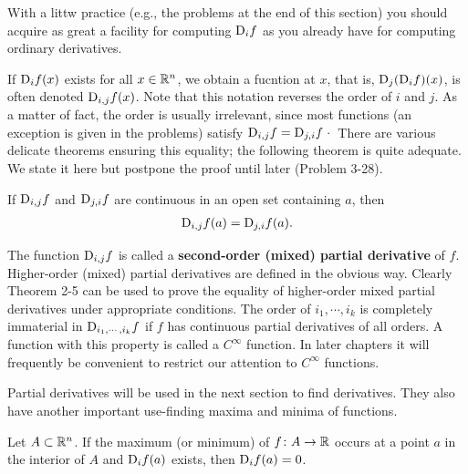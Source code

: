 With a littw practice (e.g., the problems at the end of this
section) you should acquire as great a facility for computing
$\mathrm{D}_if$ as you already have for computing ordinary derivatives.

If $\mathrm{D}_if(x)$ exists for all $x\in \mathbb{R}^n$, we obtain a fucntion at $x$, that 
is, $\mathrm{D}_j(\mathrm{D}_if)(x)$, is often denoted $\mathrm{D}_{i,j}f(x)$. Note that this notation 
reverses the order of $i$ and $j$. As a matter of fact, the
order is usually irrelevant, since most functions (an exception is
given in the problems) satisfy $\mathrm{D}_{i,j}f = \mathrm{D}_{j,i}f$· There are various
delicate theorems ensuring this equality; the following theorem
is quite adequate. We state it here but postpone the proof until later (Problem 3-28).

\begin{theorem}
    If $\mathrm{D}_{i,j}f$ and $\mathrm{D}_{j,i}f$ are continuous in an open set containing $a$, then 
    \begin{align*}
        \mathrm{D}_{i,j}f(a) = \mathrm{D}_{j,i}f(a).
    \end{align*}
\end{theorem}

The function $\mathrm{D}_{i,j}f$ is called a \textbf{second-order (mixed) partial derivative}
of $f$. Higher-order (mixed) partial derivatives are defined in the obvious way.
Clearly Theorem 2-5 can be used to prove the equality of higher-order mixed
partial derivatives under appropriate conditions.
The order of $i_1, \cdots ,i_k$ is completely immaterial in $\mathrm{D}_{i_1,\cdots,i_k}f$
if $f$ has continuous partial derivatives of all orders. A function
with this property is called a $C^\infty$ function. In later chapters
it will frequently be convenient to restrict our attention to $C^\infty$
functions.

Partial derivatives will be used in the next section to find
derivatives. They also have another important use-finding
maxima and minima of functions.

\begin{theorem}
  Let $A\subset \mathbb{R}^n$. If the maximum (or minimum) of $f\colon{}A\to \mathbb{R}$ occurs at a 
  point $a$ in the interior of $A$ and $\mathrm{D}_if(a)$ exists, then $\mathrm{D}_if(a) = 0$.
\end{theorem}

